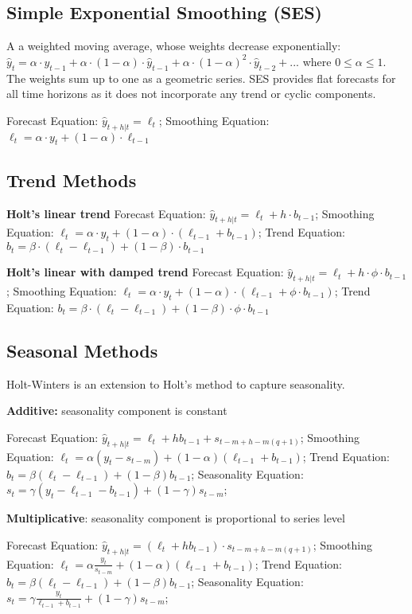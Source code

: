 \subsection{Simple Exponential Smoothing (SES)}
A a weighted moving average, whose weights decrease exponentially:
$ \hat{y}_{t} = \alpha \cdot y_{t-1} + \alpha \cdot (1 - \alpha) \cdot \hat{y}_{t-1} + \alpha \cdot (1 - \alpha)^2 \cdot \hat{y}_{t-2} + ... $
where $ 0 \le \alpha \le 1 $. The weights sum up to one as a geometric series.
SES provides flat forecasts for all time horizons as it does not incorporate any trend or cyclic components.

Forecast Equation: $ \hat{y}_{t+h|t} = \ell_t $;
Smoothing Equation: $ \ell_t = \alpha \cdot y_t + (1 - \alpha) \cdot \ell_{t-1} $

\subsection{Trend Methods}
\textbf{Holt's linear trend}
Forecast Equation: $ \hat{y}_{t+h|t} = \ell_t + h \cdot b_{t-1} $;
Smoothing Equation: $ \ell_t = \alpha \cdot y_t + (1 - \alpha) \cdot (\ell_{t-1} + b_{t-1}) $;
Trend Equation: $ b_t = \beta \cdot (\ell_t - \ell_{t-1}) + (1 - \beta) \cdot b_{t-1} $

\textbf{Holt's linear with damped trend}
Forecast Equation: $ \hat{y}_{t+h|t} = \ell_t + h \cdot \phi \cdot b_{t-1} $;
Smoothing Equation: $ \ell_t = \alpha \cdot y_t + (1 - \alpha) \cdot (\ell_{t-1} + \phi \cdot b_{t-1}) $;
Trend Equation: $ b_t = \beta \cdot (\ell_t - \ell_{t-1}) + (1 - \beta) \cdot \phi \cdot b_{t-1} $

\subsection{Seasonal Methods}
Holt-Winters is an extension to Holt's method to capture seasonality.

\textbf{Additive:} seasonality component is constant

Forecast Equation: $ \hat{y}_{t+h|t} = \ell_t + hb_{t-1} + s_{t-m+h-m(q+1)} $;
Smoothing Equation: $ \ell_t = \alpha (y_t - s_{t-m}) + (1 - \alpha)(\ell_{t-1} + b_{t-1}) $;
Trend Equation: $ b_t = \beta (\ell_t - \ell_{t-1}) + (1 - \beta) b_{t-1} $;
Seasonality Equation: $ s_t = \gamma (y_t - \ell_{t-1} - b_{t-1}) + (1 - \gamma) s_{t-m} $;

\textbf{Multiplicative}: seasonality component is proportional to series level

Forecast Equation: $ \hat{y}_{t+h|t} = (\ell_t + hb_{t-1}) \cdot s_{t-m+h-m(q+1)} $;
Smoothing Equation: $ \ell_t = \alpha \frac{y_t}{s_{t-m}} + (1 - \alpha)(\ell_{t-1} + b_{t-1}) $;
Trend Equation: $ b_t = \beta (\ell_t - \ell_{t-1}) + (1 - \beta) b_{t-1} $;
Seasonality Equation: $ s_t = \gamma \frac{y_t}{\ell_{t-1} + b_{t-1}} + (1 - \gamma) s_{t-m} $;

